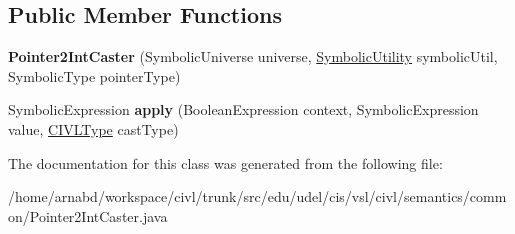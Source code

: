 \subsection*{Public Member Functions}
\begin{DoxyCompactItemize}
\item 
\hypertarget{classedu_1_1udel_1_1cis_1_1vsl_1_1civl_1_1semantics_1_1common_1_1Pointer2IntCaster_af1cdcacb3152a220cc72a2f2767d711f}{}{\bfseries Pointer2\+Int\+Caster} (Symbolic\+Universe universe, \hyperlink{interfaceedu_1_1udel_1_1cis_1_1vsl_1_1civl_1_1dynamic_1_1IF_1_1SymbolicUtility}{Symbolic\+Utility} symbolic\+Util, Symbolic\+Type pointer\+Type)\label{classedu_1_1udel_1_1cis_1_1vsl_1_1civl_1_1semantics_1_1common_1_1Pointer2IntCaster_af1cdcacb3152a220cc72a2f2767d711f}

\item 
\hypertarget{classedu_1_1udel_1_1cis_1_1vsl_1_1civl_1_1semantics_1_1common_1_1Pointer2IntCaster_acc6eecc5dc8fe61cb1211b395d3ba704}{}Symbolic\+Expression {\bfseries apply} (Boolean\+Expression context, Symbolic\+Expression value, \hyperlink{interfaceedu_1_1udel_1_1cis_1_1vsl_1_1civl_1_1model_1_1IF_1_1type_1_1CIVLType}{C\+I\+V\+L\+Type} cast\+Type)\label{classedu_1_1udel_1_1cis_1_1vsl_1_1civl_1_1semantics_1_1common_1_1Pointer2IntCaster_acc6eecc5dc8fe61cb1211b395d3ba704}

\end{DoxyCompactItemize}


The documentation for this class was generated from the following file\+:\begin{DoxyCompactItemize}
\item 
/home/arnabd/workspace/civl/trunk/src/edu/udel/cis/vsl/civl/semantics/common/Pointer2\+Int\+Caster.\+java\end{DoxyCompactItemize}
